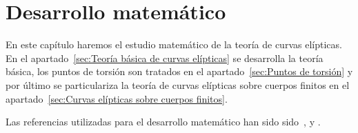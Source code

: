 \chapter{Desarrollo matemático}
\label{ch:Desarrollo matemático}



En este capítulo haremos el estudio matemático de la teoría de curvas elípticas. En el apartado~\ref{sec:Teoría básica de curvas elípticas} se desarrolla la teoría básica, los puntos de torsión son tratados en el apartado~\ref{sec:Puntos de torsión} y por último se particulariza la teoría de curvas elípticas sobre cuerpos finitos en el apartado~\ref{sec:Curvas elípticas sobre cuerpos finitos}.

Las referencias utilizadas para el desarrollo matemático han sido sido~\cite{Washington:2008}, \cite{Hankerson:2003} y \cite{Silverman:2009}.




